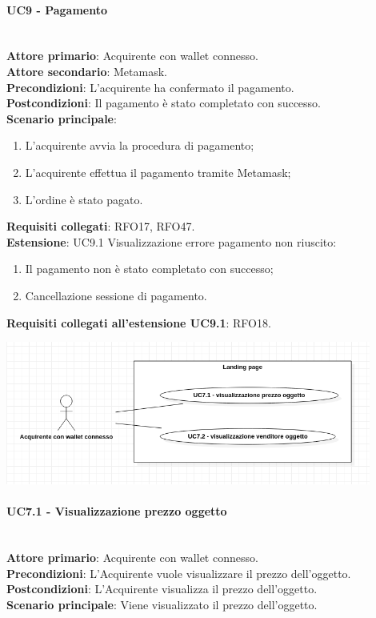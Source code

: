 \documentclass[a4paper, 12pt]{article}
\begin{document}
\paragraph{UC9 - Pagamento}\\
\textbf{Attore primario}: Acquirente con wallet connesso.\\
\textbf{Attore secondario}: Metamask.\\
\textbf{Precondizioni}: L'acquirente ha confermato il pagamento.\\
\textbf{Postcondizioni}: Il pagamento è stato completato con successo.\\
\textbf{Scenario principale}:
\begin{enumerate}
    \item L'acquirente avvia la procedura di pagamento;
    \item L'acquirente effettua il pagamento tramite Metamask;
    \item L'ordine è stato pagato.
\end{enumerate}
\textbf{Requisiti collegati}: RFO17, RFO47.\\
\textbf{Estensione}:
UC9.1 Visualizzazione errore pagamento non riuscito:
\begin{enumerate}
    \item Il pagamento non è stato completato con successo;
    \item Cancellazione sessione di pagamento.
\end{enumerate}
\textbf{Requisiti collegati all'estensione UC9.1}: RFO18.

\includegraphics[width=0.9\textwidth]{UC7D}

\paragraph{UC7.1 - Visualizzazione prezzo oggetto}\\
\textbf{Attore primario}: Acquirente con wallet connesso.\\
\textbf{Precondizioni}: L'Acquirente vuole visualizzare il prezzo dell'oggetto.\\
\textbf{Postcondizioni}: L'Acquirente visualizza il prezzo dell'oggetto.\\
\textbf{Scenario principale}: Viene visualizzato il prezzo dell'oggetto.\\
\end{document}
